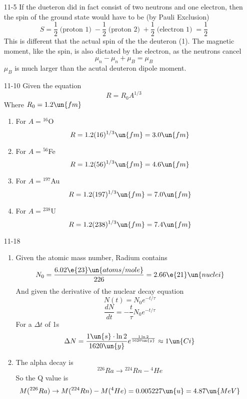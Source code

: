 \documentclass{2620hw}
\begin{document}
\maketitle

\begin{enumerate}

\item [11-5] If the dueteron did in fact consist of two neutrons and one electron, then the spin of the ground state would have to be (by Pauli Exclusion)
\[
	S = \frac{1}{2} \;\text{(proton 1)}\;- \frac{1}{2}\;\text{(proton 2)}\; + \frac{1}{2}\;\text{(electron 1)}\; = \frac{1}{2}
\]
This is different that the actual spin of the the deuteron (1). The magnetic moment, like the spin, is also dictated by the electron, as the neutrons cancel
\[
	\mu_n - \mu_n + \mu_B = \mu_B	
\]
$\mu_B$ is much larger than the acutal deuteron dipole moment.

\item [11-10] Given the equation 
\[
	R = R_0A^{1/3}
\]
Where $R_0 = 1.2 \un{fm}$
\begin{enumerate}
	\item For $A = {}^{16}$O
	\[
		R = 1.2 (16)^{1/3} \un{fm} = 3.0 \un{fm}
	\]
	\item For $A = {}^{56}$Fe
	\[
		R = 1.2 (56)^{1/3} \un{fm} = 4.6 \un{fm}
	\]
	\item For $A = {}^{197}$Au
	\[
		R = 1.2 (197)^{1/3} \un{fm} = 7.0 \un{fm}
	\]
	\item For $A = {}^{238}$U
	\[
		R = 1.2 (238)^{1/3} \un{fm} = 7.4 \un{fm}
	\]

\end{enumerate}

\item [11-18] 
\begin{enumerate}
	\item Given the atomic mass number, Radium contains
	\[
		N_0 = \frac{6.02\e{23}\un{atoms/mole}}{226} = 2.66\e{21}\un{nuclei}
	\]
	And given the derivative of the nuclear decay equation
	\[
		N(t) = N_0e^{-t/\tau}
	\]
	\[
		\frac{dN}{dt} = -\frac{t}{\tau}N_0e^{-t/\tau}
	\]
	For a $\Delta t$ of 1s
	\[
		\Delta N = \frac{1\un{s} \cdot \ln 2}{1620\un{y}} e^{\frac{1 \ln 2}{1620 \un{y}}} \approx 1 \un{Ci}
	\]
	\item The alpha decay is 
	\[
		{}^{226}Ra \rightarrow {}^{224} Rn - {}^{4}He
	\]
	So the Q value is 
	\[
		M({}^{226}Ra) \rightarrow M({}^{224} Rn) - M ({}^{4}He) = 0.005227 \un{u} = 4.87 \un{MeV}
	\]
\end{enumerate}


\end{enumerate}
\end{document}

